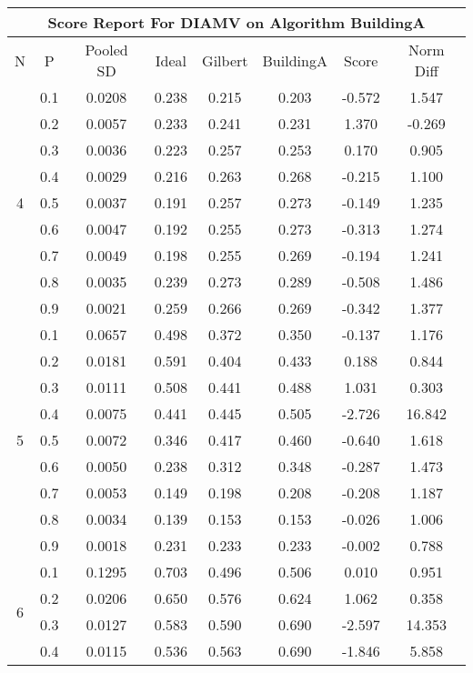 \documentclass[11pt,a4paper]{report}
\begin{document}
\begin{longtable}{ | c | c || c | c | c | c | c | c | }
\hline
\multicolumn{8}{|c|}{ Score Report For DIAMV on Algorithm BuildingA} \\
\hline
N & P & Pooled SD &  Ideal &  Gilbert & BuildingA  & Score & Norm Diff \\
 \hline
 \hline
 \endhead
\multirow{9}{*}{4} & 0.1 & 0.0208 & 0.238 & 0.215 & 0.203 & -0.572 & 1.547 \\
 & 0.2 & 0.0057 & 0.233 & 0.241 & 0.231 & 1.370 & -0.269 \\
 & 0.3 & 0.0036 & 0.223 & 0.257 & 0.253 & 0.170 & 0.905 \\
 & 0.4 & 0.0029 & 0.216 & 0.263 & 0.268 & -0.215 & 1.100 \\
 & 0.5 & 0.0037 & 0.191 & 0.257 & 0.273 & -0.149 & 1.235 \\
 & 0.6 & 0.0047 & 0.192 & 0.255 & 0.273 & -0.313 & 1.274 \\
 & 0.7 & 0.0049 & 0.198 & 0.255 & 0.269 & -0.194 & 1.241 \\
 & 0.8 & 0.0035 & 0.239 & 0.273 & 0.289 & -0.508 & 1.486 \\
 & 0.9 & 0.0021 & 0.259 & 0.266 & 0.269 & -0.342 & 1.377 \\
 \hline
\multirow{9}{*}{5} & 0.1 & 0.0657 & 0.498 & 0.372 & 0.350 & -0.137 & 1.176 \\
 & 0.2 & 0.0181 & 0.591 & 0.404 & 0.433 & 0.188 & 0.844 \\
 & 0.3 & 0.0111 & 0.508 & 0.441 & 0.488 & 1.031 & 0.303 \\
 & 0.4 & 0.0075 & 0.441 & 0.445 & 0.505 & -2.726 & 16.842 \\
 & 0.5 & 0.0072 & 0.346 & 0.417 & 0.460 & -0.640 & 1.618 \\
 & 0.6 & 0.0050 & 0.238 & 0.312 & 0.348 & -0.287 & 1.473 \\
 & 0.7 & 0.0053 & 0.149 & 0.198 & 0.208 & -0.208 & 1.187 \\
 & 0.8 & 0.0034 & 0.139 & 0.153 & 0.153 & -0.026 & 1.006 \\
 & 0.9 & 0.0018 & 0.231 & 0.233 & 0.233 & -0.002 & 0.788 \\
 \hline
\multirow{9}{*}{6} & 0.1 & 0.1295 & 0.703 & 0.496 & 0.506 & 0.010 & 0.951 \\
 & 0.2 & 0.0206 & 0.650 & 0.576 & 0.624 & 1.062 & 0.358 \\
 & 0.3 & 0.0127 & 0.583 & 0.590 & 0.690 & -2.597 & 14.353 \\
 & 0.4 & 0.0115 & 0.536 & 0.563 & 0.690 & -1.846 & 5.858 \\

\end{longtable}
\end{document}
